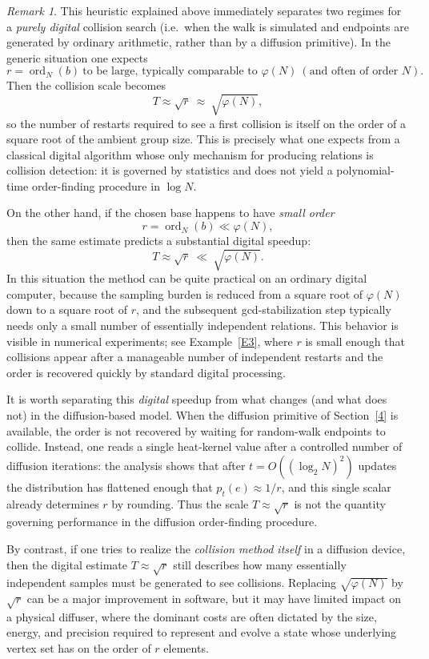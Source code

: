 \documentclass[11pt,reqno]{article}
\numberwithin{equation}{section}
\DeclareMathOperator{\ord}{ord}
\theoremstyle{plain}
\theoremstyle{definition}
\theoremstyle{remark}
\newtheorem{remark}[theorem]{Remark}
\begin{document}
\begin{remark}
This heuristic explained above immediately separates two regimes for a \emph{purely digital} collision search
(i.e.\ when the walk is simulated and endpoints are generated by ordinary arithmetic, rather than
by a diffusion primitive).  In the generic situation one expects
\[
r=\ord_N(b)\ \text{to be large, typically comparable to }\varphi(N)\ (\text{and often of order }N).
\]
Then the collision scale becomes
\[
T\approx \sqrt{r}\ \approx\ \sqrt{\varphi(N)},
\]
so the number of restarts required to see a first collision is itself on the order of a square
root of the ambient group size.  This is precisely what one expects from a classical digital
algorithm whose only mechanism for producing relations is collision detection: it is governed by
statistics and does not yield a polynomial-time order-finding procedure in $\log N$.

On the other hand, if the chosen base happens to have \emph{small order}
\[
r=\ord_N(b)\ll \varphi(N),
\]
then the same estimate predicts a substantial digital speedup:
\[
T\approx \sqrt{r}\ \ll\ \sqrt{\varphi(N)}.
\]
In this situation the method can be quite practical on an ordinary digital computer, because the
sampling burden is reduced from a square root of $\varphi(N)$ down to a square root of $r$, and the
subsequent gcd-stabilization step typically needs only a small number of essentially independent
relations.  This behavior is visible in numerical experiments; see Example~\ref{E3}, where $r$ is
small enough that collisions appear after a manageable number of independent restarts and the
order is recovered quickly by standard digital processing.

It is worth separating this \emph{digital} speedup from what changes (and what does not) in the
diffusion-based model.  When the diffusion primitive of Section~\ref{4} is available, the order is not
recovered by waiting for random-walk endpoints to collide.  Instead, one reads a single heat-kernel
value after a controlled number of diffusion iterations: the analysis shows that after
$t=O((\log_2 N)^2)$ updates the distribution has flattened enough that $p_t(e)\approx 1/r$, and this
single scalar already determines $r$ by rounding.  Thus the scale $T\approx \sqrt{r}$ is not
the quantity governing performance in the diffusion order-finding procedure.

By contrast, if one tries to realize the \emph{collision method itself} in a diffusion device, then the
digital estimate $T\approx \sqrt{r}$ still describes how many essentially independent samples must be
generated to see collisions. Replacing $\sqrt{\varphi(N)}$ by $\sqrt{r}$ can be a major improvement in software, but it may have
limited impact on a physical diffuser, where the dominant costs are often dictated by the size,
energy, and precision required to represent and evolve a state whose underlying vertex set has
on the order of $r$ elements.



\end{remark}
\end{document}
